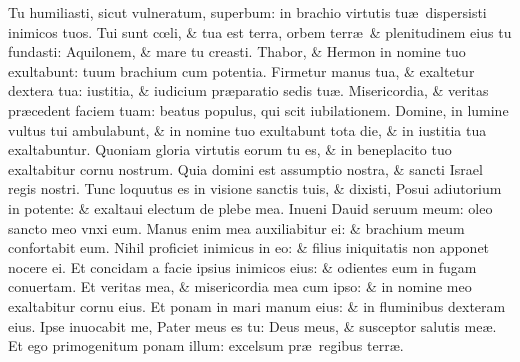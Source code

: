 \documentclass[a5paper,10pt]{book}
\def\ae{æ}
\def\oe{œ}
\begin{document}
\begin{multicols*}{2}
\newline \color{red} T\color{black}u humiliasti, sicut vulneratum, superbum: in brachio virtutis tu\ae \ dispersisti inimicos tuos.
\newline \color{red} T\color{black}ui sunt c\oe li, \& tua est terra, orbem terr\ae \ \& plenitudinem eius tu fundasti: Aquilonem, \& mare tu creasti.
\newline \color{red} T\color{black}habor, \& Hermon in nomine tuo exultabunt: tuum brachium cum potentia.
\newline \color{red} F\color{black}irmetur manus tua, \& exaltetur dextera tua: iustitia, \& iudicium pr\ae paratio sedis tu\ae .
\newline \color{red} M\color{black}isericordia, \& veritas pr\ae cedent faciem tuam: beatus populus, qui scit iubilationem.
\newline \color{red} D\color{black}omine, in lumine vultus tui ambulabunt, \& in nomine tuo exultabunt tota die, \& in iustitia tua exaltabuntur.
\newline \color{red} Q\color{black}uoniam gloria virtutis eorum tu es, \& in beneplacito tuo exaltabitur cornu nostrum.
\newline \color{red} Q\color{black}uia domini est assumptio nostra, \& sancti Israel regis nostri.
\newline \color{red} T\color{black}unc loquutus es in visione sanctis tuis, \& dixisti, Posui adiutorium in potente: \& exaltaui electum de plebe mea.
\newline \color{red} I\color{black}nueni Dauid seruum meum: oleo sancto meo vnxi eum.
\newline \color{red} M\color{black}anus enim mea auxiliabitur ei: \& brachium meum confortabit eum.
\newline \color{red} N\color{black}ihil proficiet inimicus in eo: \& filius iniquitatis non apponet nocere ei.
\newline \color{red} E\color{black}t concidam a facie ipsius inimicos eius: \& odientes eum in fugam conuertam.
\newline \color{red} E\color{black}t veritas mea, \& misericordia mea cum ipso: \& in nomine meo exaltabitur cornu eius.
\newline \color{red} E\color{black}t ponam in mari manum eius: \& in fluminibus dexteram eius.
\newline \color{red} I\color{black}pse inuocabit me, Pater meus es tu: Deus meus, \& susceptor salutis me\ae .
\newline \color{red} E\color{black}t ego primogenitum ponam illum: excelsum pr\ae \ regibus terr\ae .

\end{multicols*}
\end{document}
